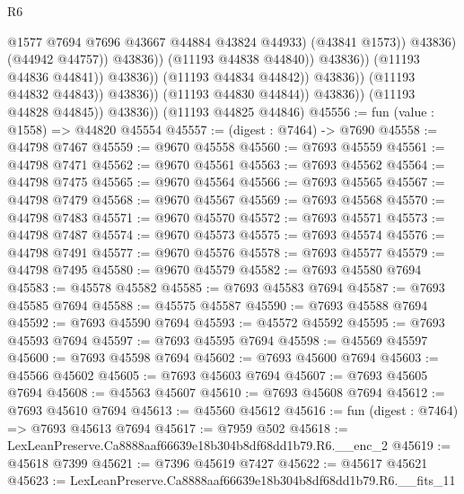 \begin{lexlean}{R6}
\begin{coremodule}
                                                    @1577
                                                    @7694
                                                    @7696
                                                    @43667
                                                    @44884
                                                    @43824
                                                    @44933)
                                                  (@43841 @1573))
                                                @43836)
                                              (@44942 @44757))
                                            @43836))
                                        (@11193 @44838 @44840))
                                      @43836))
                                  (@11193 @44836 @44841))
                                @43836))
                            (@11193 @44834 @44842))
                          @43836))
                      (@11193 @44832 @44843))
                    @43836))
                (@11193 @44830 @44844))
              @43836))
          (@11193 @44828 @44845))
        @43836))
    (@11193 @44825 @44846)
@45556 := fun (value : @1558) => @44820 @45554
@45557 := (digest : @7464) -> @7690
@45558 := @44798 @7467
@45559 := @9670 @45558
@45560 := @7693 @45559
@45561 := @44798 @7471
@45562 := @9670 @45561
@45563 := @7693 @45562
@45564 := @44798 @7475
@45565 := @9670 @45564
@45566 := @7693 @45565
@45567 := @44798 @7479
@45568 := @9670 @45567
@45569 := @7693 @45568
@45570 := @44798 @7483
@45571 := @9670 @45570
@45572 := @7693 @45571
@45573 := @44798 @7487
@45574 := @9670 @45573
@45575 := @7693 @45574
@45576 := @44798 @7491
@45577 := @9670 @45576
@45578 := @7693 @45577
@45579 := @44798 @7495
@45580 := @9670 @45579
@45582 := @7693 @45580 @7694
@45583 := @45578 @45582
@45585 := @7693 @45583 @7694
@45587 := @7693 @45585 @7694
@45588 := @45575 @45587
@45590 := @7693 @45588 @7694
@45592 := @7693 @45590 @7694
@45593 := @45572 @45592
@45595 := @7693 @45593 @7694
@45597 := @7693 @45595 @7694
@45598 := @45569 @45597
@45600 := @7693 @45598 @7694
@45602 := @7693 @45600 @7694
@45603 := @45566 @45602
@45605 := @7693 @45603 @7694
@45607 := @7693 @45605 @7694
@45608 := @45563 @45607
@45610 := @7693 @45608 @7694
@45612 := @7693 @45610 @7694
@45613 := @45560 @45612
@45616 := fun (digest : @7464) => @7693 @45613 @7694
@45617 := @7959 @502
@45618 := LexLeanPreserve.Ca8888aaf66639e18b304b8df68dd1b79.R6.__enc_2
@45619 := @45618 @7399
@45621 := @7396 @45619 @7427
@45622 := @45617 @45621
@45623 := LexLeanPreserve.Ca8888aaf66639e18b304b8df68dd1b79.R6.__fits_11

\end{coremodule}
\end{lexlean}

